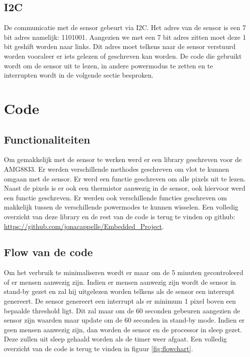 \documentclass[]{article}
\begin{document}
\subsection{I2C}
De communicatie met de sensor gebeurt via I2C. Het adres van de sensor is een 7 bit adres namelijk: 1101001. Aangezien we met een 7 bit adres zitten moet deze 1 bit geshift worden naar links. Dit adres moet telkens naar de sensor verstuurd worden vooraleer er iets gelezen of geschreven kan worden. De code die gebruikt wordt om de sensor uit te lezen, in andere powermodus te zetten en te interrupten wordt in de volgende sectie besproken. 


\section{Code}
\subsection{Functionaliteiten}
Om gemakkelijk met de sensor te werken werd er een library geschreven voor de AMG8833. Er werden verschillende methodes geschreven om vlot te kunnen omgaan met de sensor. Er werd een functie geschreven om alle pixels uit te lezen. Naast de pixels is er ook een thermistor aanwezig in de sensor, ook hiervoor werd een functie geschreven. Er werden ook verschillende functies geschreven om makkelijk tussen de verschillende powermodes te kunnen wisselen. Een volledig overzicht van deze library en de rest van de code is terug te vinden op github: \url{https://github.com/jonacappelle/Embedded_Project}.


\subsection{Flow van de code}
\label{flowcode}
Om het verbruik te minimaliseren wordt er maar om de 5 minuten gecontroleerd of er mensen aanwezig zijn. Indien er mensen aanwezig zijn wordt de sensor in stand-by gezet en zal hij uitgelezen worden telkens als de sensor een interrupt genereert. De sensor genereert een interrupt als er minimum 1 pixel boven een bepaalde threshold ligt. Dit zal maar om de 60 seconden gebeuren aangezien de sensor zijn waarden maar update om de 60 seconden in stand-by mode. Indien er geen mensen aanwezig zijn, dan worden de sensor en de processor in sleep gezet. Deze zullen uit sleep gehaald worden als de timer weer afgaat. Een volledig overzicht van de code is terug te vinden in figuur \ref{fig:flowchart}.
\end{document}
